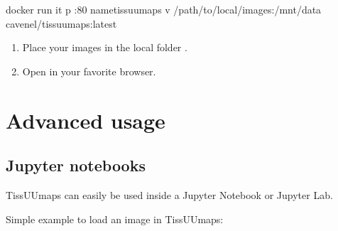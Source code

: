\documentclass[letterpaper,10pt,english,openany,oneside]{sphinxmanual}
\begin{document}
\begin{sphinxVerbatim}[commandchars=\\\{\}]
docker run \PYGZhy{}it \PYGZhy{}p :80 \PYGZhy{}\PYGZhy{}nametissuumaps \PYGZhy{}v /path/to/local/images:/mnt/data cavenel/tissuumaps:latest
\end{sphinxVerbatim}
\begin{enumerate}
%
\item {} 
\sphinxAtStartPar
Place your images in the local folder .

\item {} 
\sphinxAtStartPar
Open  in your favorite browser.

\end{enumerate}

\sphinxstepscope


\chapter{Advanced usage}
\label{\detokenize{docs/advanced/index:advanced-usage}}\label{\detokenize{docs/advanced/index::doc}}
\sphinxstepscope


\section{Jupyter notebooks}
\label{\detokenize{docs/advanced/jupyter:jupyter-notebooks}}\label{\detokenize{docs/advanced/jupyter::doc}}
\sphinxAtStartPar
TissUUmaps can easily be used inside a Jupyter Notebook or Jupyter Lab.

\sphinxAtStartPar
Simple example to load an image in TissUUmaps:

\begin{sphinxVerbatim}[commandchars=\\\{\}]
   
  \PYG{p}{[}\PYG{p}{]}

\end{sphinxVerbatim}
\label{\detokenize{docs/advanced/jupyter:module-tissuumaps.jupyter}}
\end{document}
